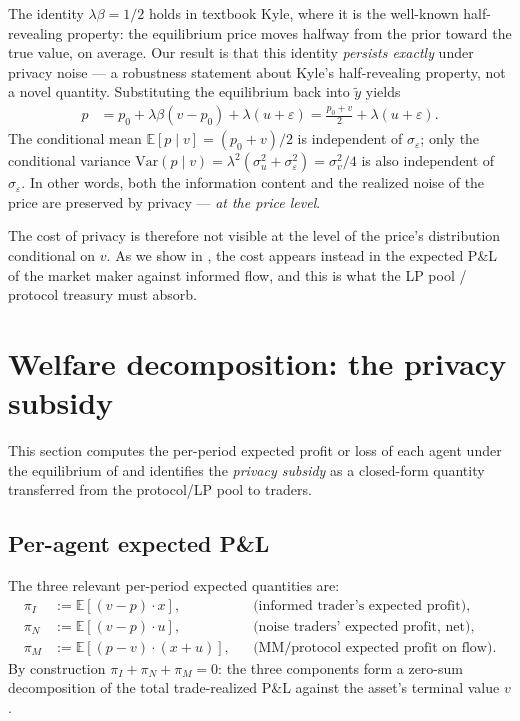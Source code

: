 \documentclass[runningheads]{llncs}
\newcommand{\E}{\mathbb{E}}
\newcommand{\Var}{\mathrm{Var}}
\newcommand{\sigv}{\sigma_v}
\newcommand{\sigu}{\sigma_u}
\newcommand{\sige}{\sigma_\varepsilon}
\newcommand{\ytil}{\tilde y}
\begin{document}
The identity $\lambda \beta = 1/2$ holds in textbook Kyle, where
it is the well-known half-revealing property: the equilibrium
price moves halfway from the prior toward the true value, on
average. Our result is that this identity \emph{persists exactly}
under privacy noise --- a robustness statement about Kyle's
half-revealing property, not a novel quantity. Substituting the
equilibrium back into $\ytil$ yields
\begin{align*}
p &= p_0 + \lambda \beta (v - p_0) + \lambda(u + \varepsilon)
   = \tfrac{p_0 + v}{2} + \lambda(u + \varepsilon).
\end{align*}
The conditional mean $\E[p \mid v] = (p_0 + v)/2$ is independent of
$\sige$; only the conditional variance $\Var(p \mid v) =
\lambda^2(\sigu^2 + \sige^2) = \sigv^2/4$ is also independent of
$\sige$. In other words, both the information content and the
realized noise of the price are preserved by privacy ---
\emph{at the price level}.

The cost of privacy is therefore not visible at the level of the
price's distribution conditional on $v$. As we show in
, the cost appears instead in the expected P\&L
of the market maker against informed flow, and this is what the
LP pool / protocol treasury must absorb.

\section{Welfare decomposition: the privacy subsidy}
\label{sec:welfare}

This section computes the per-period expected profit or loss of each
agent under the equilibrium of  and identifies
the \emph{privacy subsidy} as a closed-form quantity transferred
from the protocol/LP pool to traders.

\subsection{Per-agent expected P\&L}

The three relevant per-period expected quantities are:
\begin{align*}
\pi_I &:= \E[(v - p) \cdot x],
  &&\text{(informed trader's expected profit)}, \\
\pi_N &:= \E[(v - p) \cdot u],
  &&\text{(noise traders' expected profit, net)}, \\
\pi_M &:= \E[(p - v) \cdot (x + u)],
  &&\text{(MM/protocol expected profit on flow)}.
\end{align*}
By construction $\pi_I + \pi_N + \pi_M = 0$: the three components
form a zero-sum decomposition of the total trade-realized P\&L
against the asset's terminal value $v$.
\end{document}
